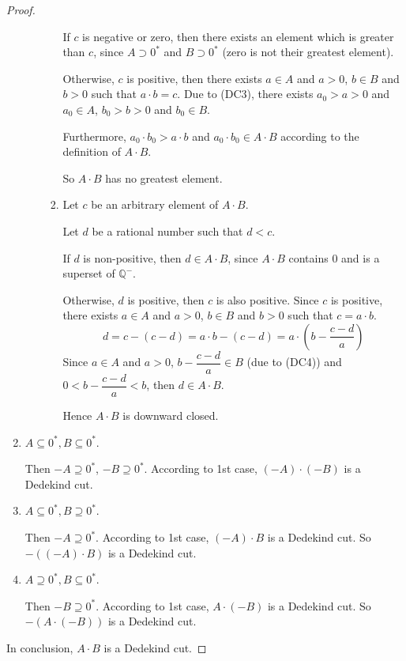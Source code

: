 \begin{proof}
\begin{enumerate}[label={\textbf{Case \arabic*.}},itemindent={0.5cm}]
\begin{enumerate}
\begin{enumerate}[label = (\roman*)]
                                  If $c$ is negative or zero, then there exists an element which is greater than $c$, since $A\supset {0}^{*}$ and $B\supset {0}^{*}$ (zero is not their greatest element).

                                  Otherwise, $c$ is positive, then there exists $a\in A$ and $a > 0$, $b\in B$ and $b > 0$ such that $a\cdot b = c$. Due to (DC3), there exists $a_{0} > a > 0$ and $a_{0}\in A$, $b_{0} > b > 0$ and $b_{0}\in B$.

                                  Furthermore, $a_{0}\cdot b_{0} > a\cdot b$ and $a_{0}\cdot b_{0}\in A\cdot B$ according to the definition of $A\cdot B$.

                                  So $A\cdot B$ has no greatest element.
                            \item Let $c$ be an arbitrary element of $A\cdot B$.

                                  Let $d$ be a rational number such that $d < c$.

                                  If $d$ is non-positive, then $d\in A\cdot B$, since $A\cdot B$ contains $0$ and is a superset of $\mathbb{Q}^{-}$.

                                  Otherwise, $d$ is positive, then $c$ is also positive. Since $c$ is positive, there exists $a\in A$ and $a > 0$, $b\in B$ and $b > 0$ such that $c = a\cdot b$.
                                  \[
                                      d = c - (c - d) = a\cdot b - (c - d) = a\cdot\left(b - \frac{c - d}{a}\right)
                                  \]
                                  Since $a\in A$ and $a > 0$, $b - \dfrac{c - d}{a}\in B$ (due to (DC4)) and $0 < b - \dfrac{c - d}{a} < b$, then $d \in A\cdot B$.

                                  Hence $A\cdot B$ is downward closed.
                        \end{enumerate}
              \end{enumerate}
        \item $A\subseteq {0}^{*}, B\subseteq {0}^{*}$.

              Then $-A\supseteq {0}^{*}$, $-B\supseteq {0}^{*}$. According to 1st case, $(-A)\cdot (-B)$ is a Dedekind cut.
        \item $A\subseteq {0}^{*}, B\supseteq {0}^{*}$.

              Then $-A\supseteq {0}^{*}$. According to 1st case, $(-A)\cdot B$ is a Dedekind cut. So $-((-A)\cdot B)$ is a Dedekind cut.
        \item $A\supseteq {0}^{*}, B\subseteq {0}^{*}$.

              Then $-B\supseteq {0}^{*}$. According to 1st case, $A\cdot (-B)$ is a Dedekind cut. So $-(A\cdot (-B))$ is a Dedekind cut.
    \end{enumerate}

    In conclusion, $A\cdot B$ is a Dedekind cut.
\end{proof}

